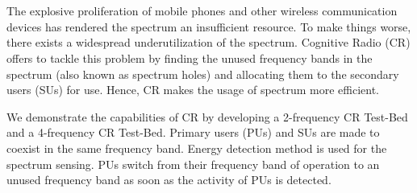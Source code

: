 \chapter*{}
The explosive proliferation of mobile phones and other wireless communication
devices has rendered the spectrum an insufficient resource. To make things
worse, there exists a widespread underutilization of the spectrum. Cognitive Radio (CR)
offers to tackle this problem by finding the unused frequency bands
in the spectrum (also known as spectrum holes) and allocating them to the
secondary users (SUs) for use. Hence, CR makes the usage of spectrum more
efficient.

We demonstrate the capabilities of CR by developing a 2-frequency CR Test-Bed
and a 4-frequency CR Test-Bed. Primary users (PUs) and SUs are made to
coexist in the same frequency band. Energy detection method is used for the
spectrum sensing. PUs switch from their frequency band of operation to an
unused frequency band as soon as the activity of PUs is detected.